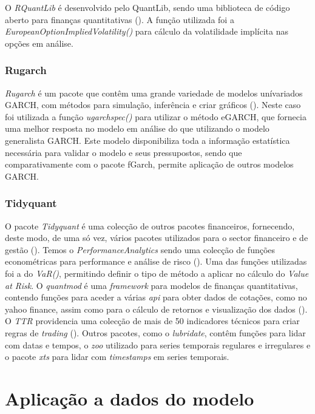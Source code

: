 \documentclass[
  12pt,
  a4paper,
  openany]{book}
\theoremstyle{definition}
\theoremstyle{definition}
\theoremstyle{definition}
\theoremstyle{remark}
\begin{document}
O \emph{RQuantLib} é desenvolvido pelo QuantLib, sendo uma biblioteca de código aberto para finanças quantitativas (\citet{RQuantLib}). A função utilizada foi a \emph{EuropeanOptionImpliedVolatility()} para cálculo da volatilidade implícita nas opções em análise.

\hypertarget{rugarch}{%
\subsection{Rugarch}\label{rugarch}}

\emph{Rugarch} é um pacote que contêm uma grande variedade de modelos unívariados GARCH, com métodos para simulação, inferência e criar gráficos (\citet{rugarch}). Neste caso foi utilizada a função \emph{ugarchspec()} para utilizar o método eGARCH, que fornecia uma melhor resposta no modelo em análise do que utilizando o modelo generalista GARCH. Este modelo disponibiliza toda a informação estatística necessária para validar o modelo e seus pressupostos, sendo que comparativamente com o pacote fGarch, permite aplicação de outros modelos GARCH.

\hypertarget{tidyquant}{%
\subsection{Tidyquant}\label{tidyquant}}

O pacote \emph{Tidyquant} é uma colecção de outros pacotes financeiros, fornecendo, deste modo, de uma só vez, vários pacotes utilizados para o sector financeiro e de gestão (\citet{tidyquant}). Temos o \emph{PerformanceAnalytics} sendo uma colecção de funções econométricas para performance e análise de risco (\citet{PerformanceAnalytics}). Uma das funções utilizadas foi a do \emph{VaR()}, permitindo definir o tipo de método a aplicar no cálculo do \emph{Value at Risk}. O \emph{quantmod} é uma \emph{framework} para modelos de finanças quantitativas, contendo funções para aceder a várias \emph{api} para obter dados de cotações, como no yahoo finance, assim como para o cálculo de retornos e visualização dos dados (\citet{quantmod}). O \emph{TTR} providencia uma colecção de mais de 50 indicadores técnicos para criar regras de \emph{trading} (\citet{TTR}). Outros pacotes, como o \emph{lubridate}, contêm funções para lidar com datas e tempos, o \emph{zoo} utilizado para series temporais regulares e irregulares e o pacote \emph{xts} para lidar com \emph{timestamps} em series temporais.

\hypertarget{aplicauxe7uxe3o-a-dados-do-modelo}{%
\chapter{Aplicação a dados do modelo}\label{aplicauxe7uxe3o-a-dados-do-modelo}}
\end{document}
